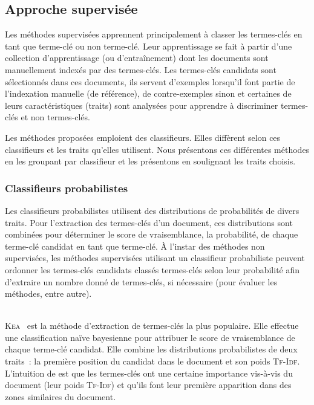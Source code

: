     \subsection{Approche supervisée}
    \label{subsec:main-state_of_the_art-automatic_keyphrase_extraction-supervised_keyphrase_extraction}
      Les méthodes supervisées apprennent principalement à classer les
      termes-clés en tant que \og{}terme-clé\fg{} ou \og{}non terme-clé\fg{}.
      Leur apprentissage se fait à partir d'une collection d'apprentissage (ou
      d'entraînement) dont les documents sont manuellement indexés par des
      termes-clés. Les termes-clés candidats sont sélectionnés dans ces
      documents, ils servent d'exemples lorsqu'il font partie de l'indexation
      manuelle (de référence), de contre-exemples sinon et certaines de leurs
      caractéristiques (traits) sont analysées pour apprendre à discriminer
      \og{}termes-clés\fg{} et \og{}non termes-clés\fg{}.

      Les méthodes proposées emploient des classifieurs. Elles diffèrent selon
      ces classifieurs et les traits qu'elles utilisent. Nous présentons ces
      différentes méthodes en les groupant par classifieur et les présentons en
      soulignant les traits choisis.

      \subsubsection{Classifieurs probabilistes}
      \label{subsubsec:main-state_of_the_art-automatic_keyphrase_extraction-supervised_keyphrase_extraction-probabilistic_models}
        Les classifieurs probabilistes utilisent des distributions de
        probabilités de divers traits. Pour l'extraction des termes-clés d'un
        document, ces distributions sont combinées pour déterminer le score de
        vraisemblance, la probabilité, de chaque terme-clé candidat en tant que
        \og{}terme-clé\fg{}. À l'instar des méthodes non supervisées, les
        méthodes supervisées utilisant un classifieur probabiliste peuvent
        ordonner les termes-clés candidats classés \og{}termes-clés\fg{} selon
        leur probabilité afin d'extraire un nombre donné de termes-clés, si
        nécessaire (pour évaluer les méthodes, entre autre).

        ~\\\textsc{Kea}~\cite{witten1999kea} est la méthode d'extraction de
        termes-clés la plus populaire. Elle effectue une classification naïve
        bayesienne pour attribuer le score de vraisemblance de chaque terme-clé
        candidat. Elle combine les distributions probabilistes de deux traits~:
        la première position du candidat dans le document et son poids
        \textsc{Tf-Idf}. L'intuition de  est que les
        termes-clés ont une certaine importance vis-à-vis du document (leur
        poids \textsc{Tf-Idf}) et qu'ils font leur première apparition dans des
        zones similaires du document.

